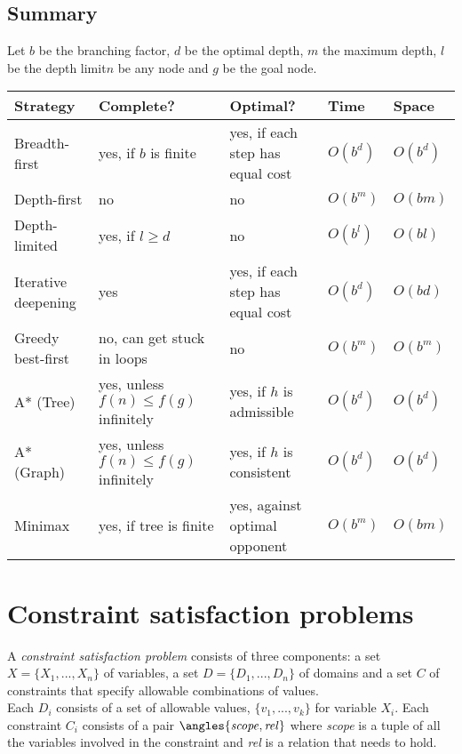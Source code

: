 \documentclass{article}
\begin{document}
\subsection{Summary}

Let $b$ be the branching factor, $d$ be the optimal depth, $m$ the maximum depth, $l$ be the
depth limit$n$ be any node and $g$ be the goal node.

\begin{center}
	\begin{tabular}{l | l | l | l | l}
		\textbf{Strategy}   & \textbf{Complete?}                     & \textbf{Optimal?}                & \textbf{Time} & \textbf{Space}
		\\\hline
		Breadth-first       & yes, if $b$ is finite                  & yes, if each step has equal cost & $O(b^d)$      & $O(b^d)$       \\
		Depth-first         & no                                     & no                               & $O(b^m)$      & $O(bm)$        \\
		Depth-limited       & yes, if $l\geq d$                      & no                               & $O(b^l)$      & $O(bl)$        \\
		Iterative deepening & yes                                    & yes, if each step has equal cost & $O(b^d)$      & $O(bd)$        \\
		Greedy best-first   & no, can get stuck in loops             & no                               & $O(b^m)$      & $O(b^m)$       \\
		A* (Tree)           & yes, unless $f(n)\leq f(g)$ infinitely & yes, if $h$ is admissible        & $O(b^d)$      & $O(b^d)$       \\
		A* (Graph)          & yes, unless $f(n)\leq f(g)$ infinitely & yes, if $h$ is consistent        & $O(b^d)$      & $O(b^d)$       \\
		Minimax             & yes, if tree is finite                 & yes, against optimal opponent    & $O(b^m)$      & $O(bm)$
	\end{tabular}
\end{center}

\section{Constraint satisfaction problems}

\begin{definition}[R\&N p. 202]
	A \emph{constraint satisfaction problem} consists of three components:
	a set $X=\{X_1, ..., X_n\}$ of variables, a set $D=\{D_1, ..., D_n\}$ of
	domains and a set $C$ of constraints that specify allowable combinations
	of values.\\
	Each $D_i$ consists of a set of allowable values, $\{v_1, ..., v_k\}$
	for variable $X_i$. Each constraint $C_i$ consists of a pair
	$\angles{\text{\emph{scope}}, \text{\emph{rel}}}$ where \emph{scope} is a
	tuple of all the variables involved in the constraint and \emph{rel} is a
	relation that needs to hold.
\end{definition}
\end{document}
